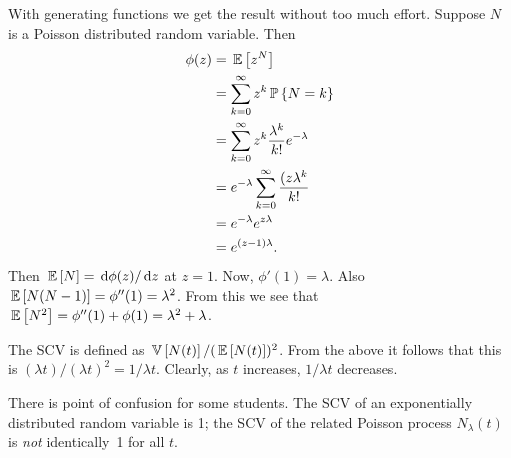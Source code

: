 \begin{question}
\begin{solution}
With generating functions we get the result without too much
effort. Suppose $N$ is a Poisson distributed random variable. Then 
\begin{equation*}
  \begin{split}
\phi(z)
&=  \,\mathbb{E}\left[z^N\right] \\
&= \sum_{k=0}^\infty z^k \,\mathbb{P}\left\{N=k\right\} \\
&= \sum_{k=0}^\infty z^k \frac{\lambda^k}{k!} e^{-\lambda}  \\
&= e^{-\lambda} \sum_{k=0}^\infty  \frac{(z\lambda^k}{k!}  \\
&= e^{-\lambda} e^{z \lambda} \\
&= e^{(z-1)\lambda}.
  \end{split}
\end{equation*}
Then $\,\mathbb{E}\left[N\right] = \,\text{d}\phi(z)/\,\text{d}z$ at $z=1$. Now, $\phi'(1) = \lambda$. Also $\,\mathbb{E}\left[N(N-1)\right]= \phi''(1) = \lambda^2$. From this we see that $\,\mathbb{E}\left[N^2\right] = \phi''(1) + \phi(1) = \lambda^2 + \lambda$. 

The SCV is defined as $\,\mathbb{V}\left[N(t)\right]/(\,\mathbb{E}\left[N(t)\right])^2$. From the above it
follows that this is $(\lambda t)/(\lambda t)^2 = 1/\lambda t$.
Clearly, as $t$
increases, $1/\lambda t$ decreases.



There is point of confusion for some students. The SCV of an
exponentially distributed random variable is 1; the SCV of the related
Poisson process $N_\lambda(t)$ is \emph{not} identically~1 for all
$t$.

\end{solution}
\end{question}




